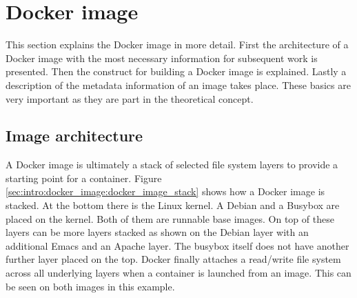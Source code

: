 \section{Docker image}
\label{sec:intro:docker_image:docker_img}
This section explains the Docker image in more detail. First the architecture of a Docker image with the most necessary information for subsequent work is presented. Then the construct for building a Docker image is explained. 
Lastly a description of the metadata information of an image takes place. These basics are very important as they are part in the theoretical concept.

\subsection{Image architecture}
\label{sec:intro:docker_image:docker_img:architecture}
A Docker image is ultimately a stack of selected file system layers to provide a starting point for a container.
Figure \ref{sec:intro:docker_image:docker_image_stack} shows how a Docker image is stacked. At the bottom there is the Linux kernel. A Debian and a Busybox are placed on the kernel.
Both of them are runnable base images.
On top of these layers can be more layers stacked as shown on the Debian layer with an additional Emacs and an Apache layer. The busybox itself does not have another further layer placed on the top.
Docker finally attaches a read/write file system across all underlying layers when a container is launched from an image. This can be seen on both images in this example.

